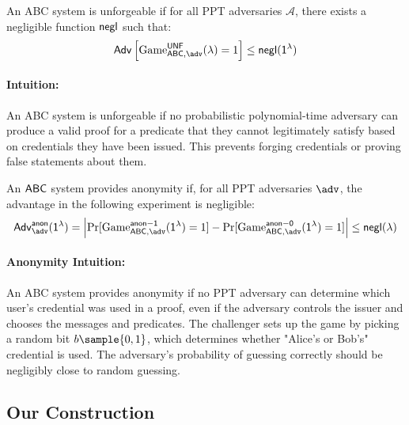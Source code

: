 \begin{definition}[Unforgeability]
An ABC system is unforgeable if for all PPT adversaries $\mathcal{A}$, there exists a negligible function $\mathsf{negl}$ such that:
\[
\mathsf{Adv}\left[\mathrm{Game}^{\mathsf{\UNF}}_{\ABC, \adv}(\lambda) = 1\right] \leq \negl(\secparam)
\]
\end{definition}

\paragraph{Intuition:} An ABC system is unforgeable if no probabilistic polynomial-time adversary can produce a valid proof for a predicate that they cannot legitimately satisfy based on credentials they have been issued. This prevents forging credentials or proving false statements about them.

\begin{definition}[Anonymity]
An $\mathsf{ABC}$ system provides anonymity if, for all PPT adversaries $\adv$, the advantage in the following experiment is negligible:
\[
\mathsf{Adv}^{\mathsf{anon}}_{\adv}(\secparam) = \left| \Pr[\mathrm{Game}^{\mathsf{anon-1}}_{\ABC, \adv}(\secparam) = 1] - \Pr[\mathrm{Game}^{\mathsf{anon-0}}_{\ABC, \adv}(\secparam) = 1] \right| \leq \negl(\lambda)
\]
\end{definition}


\paragraph{Anonymity Intuition:} An ABC system provides anonymity if no PPT adversary can determine which user's credential was used in a proof, even if the adversary controls the issuer and chooses the messages and predicates. The challenger sets up the game by picking a random bit $b \sample \{0,1\}$, which determines whether "Alice's or Bob's" credential is used. The adversary's probability of guessing correctly should be negligibly close to random guessing.




\subsection{Our Construction}



